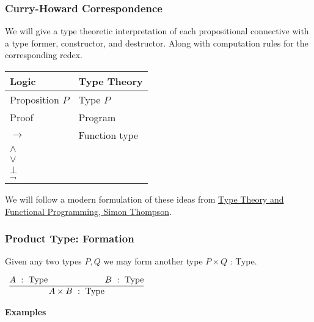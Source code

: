 \documentclass{beamer}
\theoremstyle{indentDefn} \newtheorem{defn}[]{Definition}
\begin{document}
\begin{frame}
  \frametitle{Curry-Howard Correspondence}

	We will give a type theoretic interpretation of each propositional connective with a type former, constructor, and destructor. Along with computation rules for the corresponding redex.

  \begin{center}
    \begin{tabular}{l|l}
      Logic & Type Theory \\
      \hline
      Proposition $P$ & Type $P$ \\
      Proof & Program \\
      $\to$ & Function type \\
      $\land$ &  \\
      $\lor$ & \\ 
      $\bot$ & \\
      $\lnot$
    \end{tabular}
  \end{center}

  We will follow a modern formulation of these ideas from \href{https://www.cs.kent.ac.uk/people/staff/sjt/TTFP/}{Type Theory and Functional Programming, Simon Thompson}. 
  
  \vspace{20mm}
  
\end{frame}

\begin{frame}
  \frametitle{Product Type: Formation}

  Given any two types $P,Q$ we may form another type $P \times Q$ : Type.
  
	\vspace{5mm}

    \begin{center}
  	$\begin{array}{c}
  		\infer[]{A \times B  \ : \ \text{Type}}
  			{A  \ : \ \text{Type}
  			\hspace{10mm}&\hspace{10mm}
  			 B  \ : \ \text{Type}}
  	\end{array}$  
  \end{center}
  
  \textbf{Examples}
  
  \vspace{50mm}
  
  \end{frame}
  
\end{document}
